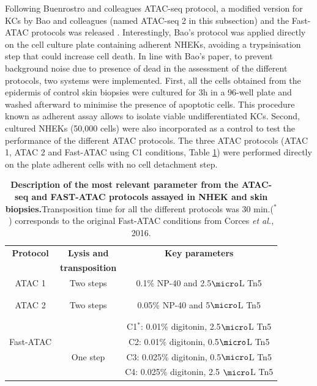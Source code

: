 Following Buenrostro and colleagues ATAC-seq protocol, a modified version for KCs by Bao and colleagues (named ATAC-seq 2 in this subsection) and the Fast-ATAC protocols was released \parencite{Bao2015, Corces2016}. Interestingly, Bao's protocol was applied directly on the cell culture plate containing adherent NHEKs, avoiding a trypsinisation step that could increase cell death. In line with Bao's paper, to prevent background noise due to presence of dead in the assessment of the different protocols, two systems were implemented. First, all the cells obtained from the epidermis of control skin biopsies were cultured for 3h in a 96-well plate and washed afterward to minimise the presence of apoptotic cells. This procedure known as adherent assay allows to isolate viable undifferentiated KCs. Second, cultured NHEKs (50,000 cells) were also incorporated as a control to test the performance of the different ATAC protocols. The three ATAC protocols (ATAC 1, ATAC 2 and Fast-ATAC using C1 conditions, Table \ref{tab:ATAC_skin_optimisation_protocols}) were performed directly on the plate adherent cells with no cell detachment step. 



\begin{table}[htbp]
\begin{tabular}{@{} c c c}
\toprule
\textbf{Protocol}   & \textbf{Lysis and} & \textbf{Key parameters} \\
                    & \textbf{transposition} &  \\
\midrule
\midrule
ATAC 1          & Two steps & 0.1\% NP-40 and 2.5$\micro$L Tn5  \\
\parencite{Buenrostro2013} && \\
&&\\
ATAC 2          &Two steps   & 0.05\% NP-40 and 5$\micro$L Tn5  \\
\parencite{Bao2015} &&\\
&&\\
                                 &             & C1$^\ast$: 0.01\% digitonin, 2.5$\micro$L Tn5 \\
 Fast-ATAC                       &             & C2: 0.01\% digitonin, 0.5$\micro$L Tn5 \\
\parencite{Corces2016}           & One step    & C3: 0.025\% digitonin, 0.5$\micro$L Tn5 \\
													       &             & C4: 0.025\% digitonin, 2.5 $\micro$L Tn5 \\
\bottomrule
\end{tabular}
\medskip %
\caption[Description of the most relevant parameter from the ATAC-seq and FAST-ATAC protocols assayed in NHEK and skin biopsies.]{\textbf{Description of the most relevant parameter from the ATAC-seq and FAST-ATAC protocols assayed in NHEK and skin biopsies.}Transposition time for all the different protocols was 30 min.($^\ast$) corresponds to the original Fast-ATAC conditions from Corces \textit{et al.}, 2016.}
\label{tab:ATAC_skin_optimisation_protocols}
\end{table}
\bigskip %

